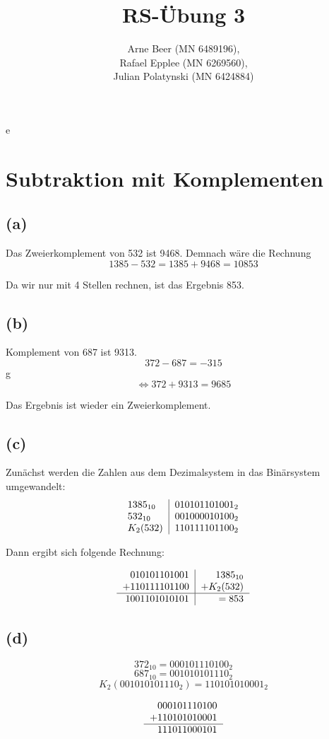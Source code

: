 \documentclass{article}
\title{RS-Übung 3}
\author{Arne Beer (MN 6489196), \\
Rafael Epplee (MN 6269560), \\
Julian Polatynski (MN 6424884)}
\begin{document}
\maketitl e

\section{Subtraktion mit Komplementen}
\subsection*{(a)}
Das Zweierkomplement von 532 ist 9468. Demnach wäre die Rechnung
\[ 1385-532 = 1385
+9468
= 10853\]

Da wir nur mit 4 Stellen rechnen, ist das Ergebnis 853.

\subsection*{(b)}
Komplement von 687 ist 9313.
\[372 - 687 = -315\]g
\[\Leftrightarrow 372 + 9313 = 9685\]

Das Ergebnis ist wieder ein Zweierkomplement.

\subsection*{(c)}
Zunächst werden die Zahlen aus dem Dezimalsystem in das Binärsystem umgewandelt:
\[\begin{tabular}{l | r}
$1385_{10}$ & $010101101001_2$ \\
$532_{10}$ & $001000010100_2$ \\
$K_2(532)$ & $110111101100_2$ \\
\end{tabular}\]

Dann ergibt sich folgende Rechnung:

\[\begin{tabular}{r | r}
$010101101001$ & $1385_{10}$\\
$+110111101100$ & $+K_2(532)$\\ \hline
$1001101010101$ & $=853$
\end{tabular}\]

\subsection*{(d)}
\[ 372_{10}=000101110100_2 \]
\[ 687_{10}=001010101110_2 \]
\[ K_2(001010101110_2)=110101010001_2 \]

\[\begin{tabular}{r}
000101110100\\
+110101010001\\
\hline
$111011000101$\\
\end{tabular}\]
\end{document}
